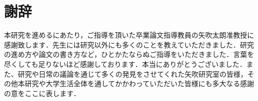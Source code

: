 



\chapter*{謝辞}

本研究を進めるにあたり，ご指導を頂いた卒業論文指導教員の矢吹太朗准教授に感謝致します．先生には研究以外にも多くのことを教えていただきました．研究の進め方や論文の書き方など，ひとかたならぬご指導をいただきました．言葉を尽くしても足りないほど感謝しております．本当にありがとうございました．また、研究や日常の議論を通じて多くの発見をさせてくれた矢吹研究室の皆様，その他本研究や大学生活全体を通してかかわっていただいた皆様にも多大なる感謝の意をここに表します．




